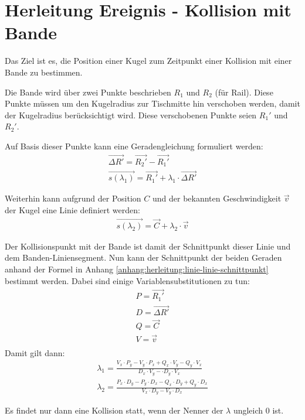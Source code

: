 \section{Herleitung Ereignis - Kollision mit Bande}\label{anhang:herleitung:event:collisionWithRail}
Das Ziel ist es, die Position einer Kugel zum Zeitpunkt einer Kollision mit einer Bande zu bestimmen.

Die Bande wird über zwei Punkte beschrieben $R_1$ und $R_2$ (für Rail).
Diese Punkte müssen um den Kugelradius zur
Tischmitte hin verschoben werden, damit der Kugelradius berücksichtigt wird.
Diese verschobenen Punkte seien $R_1'$ und $R_2'$.

Auf Basis dieser Punkte kann eine Geradengleichung formuliert werden:
\begin{align}
    \vec{\Delta R'} = \vec{R_2'} - \vec{R_1'}\\
    \vec{s(\lambda_1)} = \vec{R_1'} + \lambda_1 \cdot \vec{\Delta R'}
\end{align}

Weiterhin kann aufgrund der Position $C$ und der bekannten Geschwindigkeit $\vec{v}$ der Kugel eine Linie definiert werden:
\begin{align}
    \vec{s(\lambda_2)} = \vec{C} + \lambda_2 \cdot \vec{v}
\end{align}

Der Kollisionspunkt mit der Bande ist damit der Schnittpunkt dieser Linie und dem Banden-Liniensegment.
Nun kann der Schnittpunkt der beiden Geraden anhand der Formel in Anhang \ref{anhang:herleitung:linie-linie-schnittpunkt} bestimmt werden.
Dabei sind einige Variablensubstitutionen zu tun:
\begin{align}
    P = \vec{R_1'}\\
    D = \vec{\Delta R'}\\
    Q = \vec{C}\\
    V = \vec{v}\\
\end{align}
Damit gilt dann:
\begin{align}
    \lambda_1 = \frac{V_x \cdot P_y - V_y \cdot P_x + Q_x \cdot V_y - Q_y \cdot V_x}{D_x \cdot V_y - \cdot D_y \cdot V_x}\\
    \lambda_2 = \frac{P_x \cdot D_y - P_y \cdot D_x - Q_x \cdot D_y + Q_y \cdot D_x}{V_x \cdot D_y - V_y \cdot D_x}
\end{align}
\iffalse %
Nach der Variablensubstitution gilt:
\begin{align}
    \lambda_1 = \frac{\vec{v}_x \cdot \vec{R_1'}_y - \vec{v}_y \cdot \vec{R_1'}_x + \vec{C}_x \cdot \vec{v}_y - \vec{C}_y \cdot \vec{v}_x}{\vec{\Delta R'}_x \cdot \vec{v}_y - \cdot \vec{\Delta R'}_y \cdot \vec{v}_x}\\
    \lambda_2 = \frac{\vec{R_1'}_x \cdot \vec{\Delta R'}_y - \vec{R_1'}_y \cdot \vec{\Delta R'}_x - \vec{C}_x \cdot \vec{\Delta R'}_y + \vec{C}_y \cdot \vec{\Delta R'}D_x}{\vec{v}_x \cdot \vec{\Delta R'}_y - \vec{v}_y \cdot \vec{\Delta R'}_x}
\end{align}
\fi
Es findet nur dann eine Kollision statt, wenn der Nenner der $\lambda$ ungleich $0$ ist.

